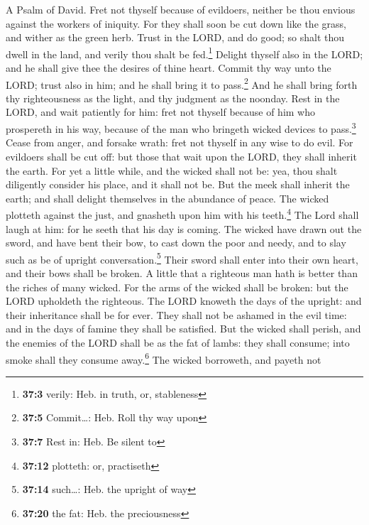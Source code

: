 A Psalm of David.  Fret not thyself because of evildoers,
neither be thou envious against the workers of iniquity. 
For they shall soon be cut down like the grass, and wither as the green
herb.  Trust in the LORD, and do good; so shalt thou dwell
in the land, and verily thou shalt be fed.\footnote{\textbf{37:3}
  verily: Heb. in truth, or, stableness}  Delight thyself
also in the LORD; and he shall give thee the desires of thine heart.
 Commit thy way unto the LORD; trust also in him; and he
shall bring it to pass.\footnote{\textbf{37:5} Commit\ldots: Heb. Roll
  thy way upon}  And he shall bring forth thy
righteousness as the light, and thy judgment as the noonday.
 Rest in the LORD, and wait patiently for him: fret not
thyself because of him who prospereth in his way, because of the man who
bringeth wicked devices to pass.\footnote{\textbf{37:7} Rest in: Heb. Be
  silent to}  Cease from anger, and forsake wrath: fret
not thyself in any wise to do evil.  For evildoers shall
be cut off: but those that wait upon the LORD, they shall inherit the
earth.  For yet a little while, and the wicked shall not
be: yea, thou shalt diligently consider his place, and it shall not be.
 But the meek shall inherit the earth; and shall delight
themselves in the abundance of peace.  The wicked
plotteth against the just, and gnasheth upon him with his
teeth.\footnote{\textbf{37:12} plotteth: or, practiseth} 
The Lord shall laugh at him: for he seeth that his day is coming.
 The wicked have drawn out the sword, and have bent their
bow, to cast down the poor and needy, and to slay such as be of upright
conversation.\footnote{\textbf{37:14} such\ldots: Heb. the upright of
  way}  Their sword shall enter into their own heart, and
their bows shall be broken.  A little that a righteous
man hath is better than the riches of many wicked.  For
the arms of the wicked shall be broken: but the LORD upholdeth the
righteous.  The LORD knoweth the days of the upright: and
their inheritance shall be for ever.  They shall not be
ashamed in the evil time: and in the days of famine they shall be
satisfied.  But the wicked shall perish, and the enemies
of the LORD shall be as the fat of lambs: they shall consume; into smoke
shall they consume away.\footnote{\textbf{37:20} the fat: Heb. the
  preciousness}  The wicked borroweth, and payeth not
